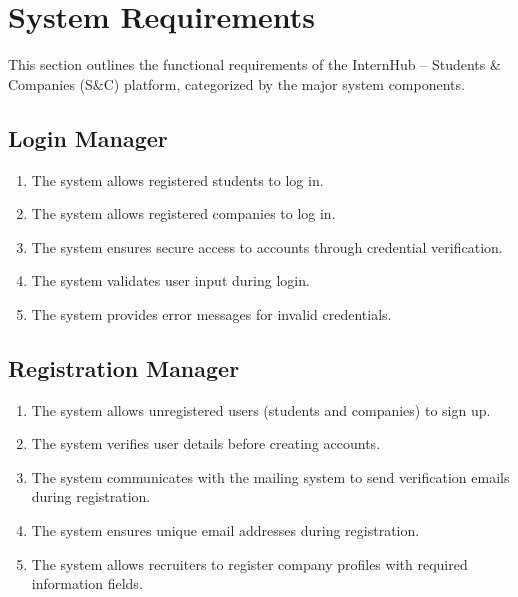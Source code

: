 \section{System Requirements}
\label{sec:system_requirements}

This section outlines the functional requirements of the InternHub – Students \& Companies (S\&C) platform, categorized by the major system components.

\subsection{Login Manager}
\label{subsec:login_manager}
\begin{enumerate}[label=R\arabic*:, itemsep=0.2em]
    \item The system allows registered students to log in.
    \item The system allows registered companies to log in.
    \item The system ensures secure access to accounts through credential verification.
    \item The system validates user input during login.
    \item The system provides error messages for invalid credentials.
\end{enumerate}

\subsection{Registration Manager}
\label{subsec:registration_manager}
\begin{enumerate}[label=R\arabic*:, itemsep=0.2em, start=6]
    \item The system allows unregistered users (students and companies) to sign up.
    \item The system verifies user details before creating accounts.
    \item The system communicates with the mailing system to send verification emails during registration.
    \item The system ensures unique email addresses during registration.
    \item The system allows recruiters to register company profiles with required information fields.
\end{enumerate}

